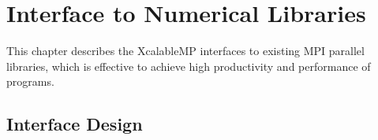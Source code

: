 









\chapter{Interface to Numerical Libraries}
\label{chap:Interface to Numerical Libraries}

   This chapter describes the XcalableMP interfaces to existing MPI
   parallel libraries, which is effective to achieve high productivity
   and performance of {\XMP} programs.
   
\section{Interface Design}

